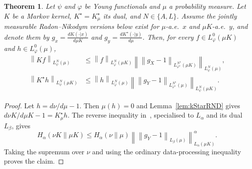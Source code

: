 \documentclass[10pt,a4paper]{amsart}
\newtheorem{theorem}{Theorem}
\begin{document}
\begin{theorem}\label{thm:psiNormsContraction}
        Let $\psi$ and $\varphi$ be Young functionals and $\mu$ %
        a probability measure. Let $K$ be a Markov kernel, %
        $K^\star=K^\star_\mu$ its dual, and $N\in \{A,L\}$. Assume the jointly measurable Radon--Nikodym versions below exist for $\mu$-a.e.\ $x$ and $\mu K$-a.e.\ $y$, and denote them by $g_x = \frac{dK(\cdot|x)}{d\mu K}$ and $g_y =\frac{dK^\star(\cdot|y)}{d\mu}$. Then, for every $f\in L_\varphi^{0}(\mu K)$ and $h \in L_\varphi^0(\mu)$,
    \begin{align}
       \left\lVert Kf \right\rVert_{L_\psi^N(\mu)}
       &\leq
       \left\lVert f \right\rVert_{L_\varphi^N(\mu K)}
       \left\lVert
       \left\lVert g_X-1\right\rVert_{L_{\varphi^\star}^{N^\star}(\mu K)}
       \right\rVert_{L_\psi^N(\mu )},
       \label{eq:forwardMixedOrlicz}\\
       \left\lVert K^\star h \right\rVert_{L_\psi^N(\mu K)}
       &\leq
       \left\lVert h \right\rVert_{L_\varphi^N(\mu )}
       \left\lVert
       \left\lVert g_Y-1\right\rVert_{L_{\varphi^\star}^{N^\star}(\mu )}
       \right\rVert_{L_\psi^N(\mu K)}.
       \label{eq:reverseMixedOrlicz}
    \end{align}
    \end{theorem}

\begin{proof}
Let $h=d\nu/d\mu-1$.  Then $\mu(h)=0$ and
Lemma~\ref{lem:kStarRND} gives
$d\nu K/d\mu K-1=K_\mu^\star h$.  The reverse inequality
in~, specialised to $L_\alpha$ and its
dual $L_\beta$, gives
\begin{equation}
H_\alpha(\nu K\|\mu K)
\leq
H_\alpha(\nu\|\mu)
\left\lVert
\left\lVert g_Y-1\right\rVert_{L_\beta(\mu)}
\right\rVert_{L_\alpha(\mu K)}^\alpha.
\end{equation}
Taking the supremum over $\nu$ and using the ordinary
data-processing inequality proves the claim.
\end{proof}
\end{document}
